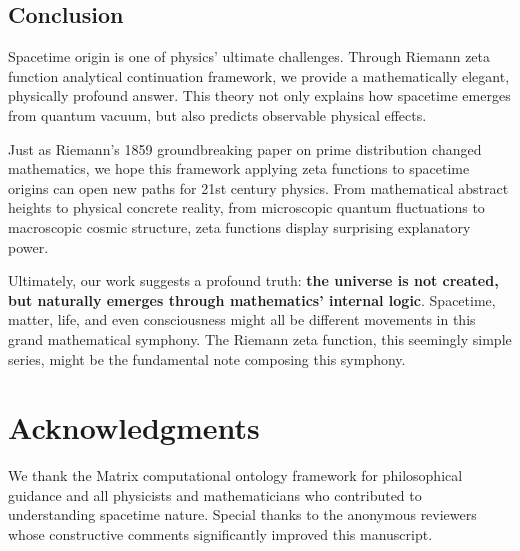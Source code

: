 \documentclass[12pt,a4paper]{article}
\begin{document}
\subsection{Conclusion}

Spacetime origin is one of physics' ultimate challenges. Through Riemann zeta function analytical continuation framework, we provide a mathematically elegant, physically profound answer. This theory not only explains how spacetime emerges from quantum vacuum, but also predicts observable physical effects.

Just as Riemann's 1859 groundbreaking paper on prime distribution changed mathematics, we hope this framework applying zeta functions to spacetime origins can open new paths for 21st century physics. From mathematical abstract heights to physical concrete reality, from microscopic quantum fluctuations to macroscopic cosmic structure, zeta functions display surprising explanatory power.

Ultimately, our work suggests a profound truth: \textbf{the universe is not created, but naturally emerges through mathematics' internal logic}. Spacetime, matter, life, and even consciousness might all be different movements in this grand mathematical symphony. The Riemann zeta function, this seemingly simple series, might be the fundamental note composing this symphony.

\section*{Acknowledgments}

We thank the Matrix computational ontology framework for philosophical guidance and all physicists and mathematicians who contributed to understanding spacetime nature. Special thanks to the anonymous reviewers whose constructive comments significantly improved this manuscript.
\end{document}
